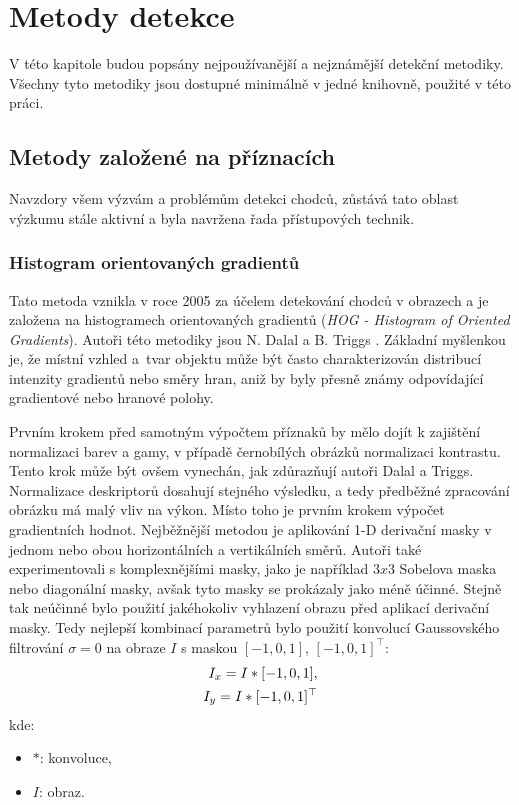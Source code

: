 \section{Metody detekce}
V této kapitole budou popsány nejpoužívanější a nejznámější detekční metodiky. Všechny tyto metodiky jsou dostupné minimálně v jedné knihovně, použité v této práci.  

\subsection{Metody založené na příznacích}
Navzdory všem výzvám a problémům detekci chodců, zůstává tato oblast výzkumu stále aktivní a byla navržena řada přístupových technik.
\subsubsection*{Histogram orientovaných gradientů}
Tato metoda vznikla v roce 2005 za účelem detekování chodců v obrazech a je založena na histogramech orientovaných gradientů (\textit{HOG - Histogram of Oriented Gradients}). Autoři této metodiky jsou N. Dalal a B. Triggs \cite{hog:dalal}. Základní myšlenkou je, že místní vzhled a~tvar objektu může být často charakterizován distribucí intenzity gradientů nebo směry hran, aniž by byly přesně známy odpovídající gradientové nebo hranové polohy.  

Prvním krokem před samotným výpočtem příznaků by mělo dojít k zajištění normalizaci barev a gamy, v případě černobílých obrázků normalizaci kontrastu. Tento krok může být ovšem vynechán, jak zdůrazňují autoři Dalal a Triggs. Normalizace deskriptorů dosahují stejného výsledku, a tedy předběžné zpracování obrázku má malý vliv na výkon. Místo toho je prvním krokem výpočet gradientních hodnot. Nejběžnější metodou je aplikování 1-D derivační masky v jednom nebo obou horizontálních a vertikálních směrů. Autoři také experimentovali s komplexnějšími masky, jako je například $3x3$ Sobelova maska nebo diagonální masky, avšak tyto masky se prokázaly jako méně účinné. Stejně tak neúčinné bylo použití jakéhokoliv vyhlazení obrazu před aplikací derivační masky. Tedy nejlepší kombinací parametrů bylo použití konvolucí Gaussovského filtrování $\sigma = 0$ na obraze $I$ s maskou $[-1, 0, 1]$, $[-1,0,1]^\top$:
\begin{equation}
\centering
 \label{eq:hogMask}
 \begin{aligned}
I_x = I * [-1, 0, 1], \\
I_y = I * [-1, 0, 1]^\top
 \end{aligned}
\end{equation}
kde:
\begin{itemize}[label=]
  \item $*$: konvoluce,
  \item $I$: obraz.
\end{itemize}

